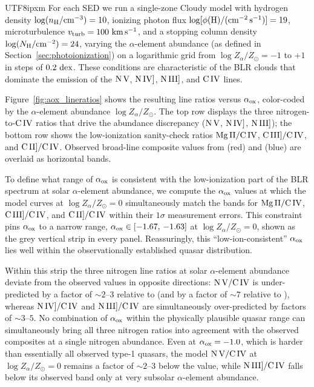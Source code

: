 \documentclass[linenumbers,trackchanges]{aastex701}
\begin{document}
\begin{CJK*}{UTF8}{ipxm}
For each SED we run a single-zone Cloudy model with hydrogen density
$\log(n_{\rm H}/{\rm cm^{-3}}) = 10$, ionizing photon flux
$\log[\phi({\rm H})/(\rm cm^{-2}\,s^{-1})] = 19$, microturbulence
$v_{\rm turb} = 100~\rm km\,s^{-1}$, and a stopping column density
$\log(N_{\rm H}/{\rm cm^{-2}}) = 24$, varying the $\alpha$-element
abundance (as defined in Section~\ref{sec:photoionization}) on a
logarithmic grid from $\log Z_{\alpha}/Z_{\odot} = -1$ to $+1$ in steps
of $0.2~\rm dex$.  These conditions are characteristic of the BLR clouds
that dominate the emission of the $\rm N\,V$, $\rm N\,IV]$, $\rm N\,III]$,
and $\rm C\,IV$ lines.

Figure~\ref{fig:aox_lineratios} shows the resulting line ratios versus
$\alpha_{\rm ox}$, color-coded by the $\alpha$-element abundance
$\log Z_{\alpha}/Z_{\odot}$.  The top row displays the three
nitrogen-to-$\rm C\,IV$ ratios that drive the abundance discrepancy
($\rm N\,V$, $\rm N\,IV]$, $\rm N\,III]$); the bottom row shows the
low-ionization sanity-check ratios $\rm Mg\,II/C\,IV$,
$\rm C\,III]/C\,IV$, and $\rm C\,II]/C\,IV$.  Observed broad-line composite
values from \citet{VandenBerk2001} (red) and \citet{constantin2003} (blue)
are overlaid as horizontal bands.

To define what range of $\alpha_{\rm ox}$ is consistent with the
low-ionization part of the BLR spectrum at solar $\alpha$-element
abundance, we compute the $\alpha_{\rm ox}$ values at which the model
curves at $\log Z_{\alpha}/Z_{\odot} = 0$ simultaneously match the
\citet{VandenBerk2001} bands for $\rm Mg\,II/C\,IV$, $\rm C\,III]/C\,IV$,
and $\rm C\,II]/C\,IV$ within their $1\sigma$ measurement errors.  This
constraint pins $\alpha_{\rm ox}$ to a narrow range,
$\alpha_{\rm ox} \in [-1.67,\,-1.63]$ at $\log Z_{\alpha}/Z_{\odot} = 0$,
shown as the grey vertical strip in every panel.  Reassuringly, this
``low-ion-consistent'' $\alpha_{\rm ox}$ lies well within the
observationally established quasar distribution.

Within this strip the three nitrogen line ratios at solar $\alpha$-element
abundance deviate from the observed values in opposite directions:
$\rm N\,V/C\,IV$ is under-predicted by a factor of $\sim2$--$3$ relative
to \citet{VandenBerk2001} (and by a factor of $\sim7$ relative to
\citet{constantin2003}), whereas $\rm N\,IV]/C\,IV$ and
$\rm N\,III]/C\,IV$ are simultaneously over-predicted by factors
of $\sim3$--$5$.  No combination of $\alpha_{\rm ox}$ within the
physically plausible quasar range can simultaneously bring all three
nitrogen ratios into agreement with the observed composites at a single
nitrogen abundance.  Even at $\alpha_{\rm ox} = -1.0$, which is harder
than essentially all observed type-1 quasars, the model
$\rm N\,V/C\,IV$ at $\log Z_{\alpha}/Z_{\odot} = 0$ remains a factor of
$\sim 2$--$3$ below the \citet{VandenBerk2001} value, while
$\rm N\,III]/C\,IV$ falls below its observed band only at very subsolar
$\alpha$-element abundance.


\end{CJK*}
\end{document}
